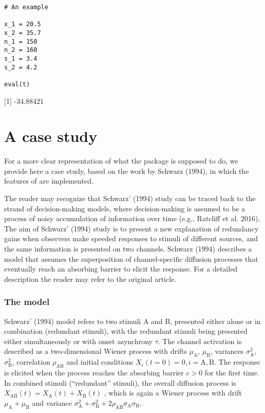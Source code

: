 \begin{verbatim}
# An example

x_1 = 20.5
x_2 = 35.7
n_1 = 150
n_2 = 160
s_1 = 3.4
s_2 = 4.2

eval(t)
\end{verbatim}

{[}1{]} -34.88421

\hypertarget{a-case-study}{%
\section{A case study}\label{a-case-study}}

For a more clear representation of what the  package is supposed to do, we provide here a case study, based on the work by Schwarz (1994), in which the features of  are implemented.

The reader may recognize that Schwarz' (1994) study can be traced back to the strand of decision-making models, where decision-making is assumed to be a process of
noisy accumulation of information over time (e.g., Ratcliff et al. 2016). The aim of
Schwarz' (1994) study is to present a new explanation of redundancy gains when
observers make speeded responses to stimuli of different sources, and the same
information is presented on two channels. Schwarz (1994) describes a model that assumes
the superposition of channel-specific diffusion processes that eventually reach
an absorbing barrier to elicit the response. For a detailed description the
reader may refer to the original article.

\hypertarget{the-model}{%
\subsubsection{The model}\label{the-model}}

Schwarz' (1994) model refers to two stimuli A and B, presented either
alone or in combination (redundant stimuli), with the redundant stimuli being
presented either simultaneously or with onset asynchrony \(\tau\). The channel
activation is described as a two-dimensional Wiener process with
drifts \(\mu_\mathrm A\), \(\mu_\mathrm B\),
variances \(\sigma^2_\mathrm A\), \(\sigma^2_\mathrm B\),
correlation \(\rho_\mathrm{AB}\) and initial
conditions \(X_i(t=0)=0, i=\mathrm{A, B}\). The response is elicited when the
process reaches the absorbing barrier \(c > 0\) for the first time. In combined
stimuli (``redundant'' stimuli), the overall diffusion process
is \(X_\mathrm{AB}(t) = X_\mathrm A(t) + X_\mathrm B(t)\) , which is again a
Wiener process with drift \(\mu_\mathrm A + \mu_\mathrm B\) and
variance \(\sigma^2_\mathrm A + \sigma^2_\mathrm B  + 2\rho_\mathrm{AB}\sigma_\mathrm A\sigma_\mathrm B\).

